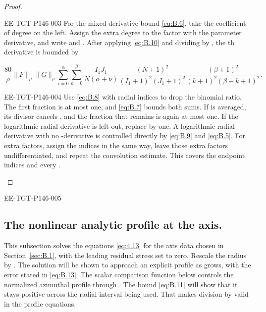 \begin{proof}
\begin{EESegment}{EE-TGT-P146-003}
For the mixed derivative bound \eqref{eq:B.6}, take the coefficient of degree
 on the left. Assign the extra degree to the factor with the parameter
derivative, and write  and .
After applying \eqref{eq:B.10} and dividing by , the
th derivative is bounded by
\end{EESegment}
\begin{equation*}
  \frac{80}{\rho}\lVert F\rVert_\rho\lVert G\rVert_\rho
  \sum_{i=0}^{\alpha}\sum_{k=0}^{\beta}
  \frac{I_1J_1}{N(\alpha+\nu)}
  \frac{(N+1)^2}{(I_1+1)^2(J_1+1)^2}
  \frac{(\beta+1)^2}{(k+1)^2(\beta-k+1)^2}.
\end{equation*}
\begin{EESegment}{EE-TGT-P146-004}
Use \eqref{eq:B.8} with radial indices  to drop the binomial ratio.
The first fraction is at most one, and \eqref{eq:B.7} bounds both sums. If
 is averaged, its divisor  cancels
, and the fraction that remains is again at most one. If the logarithmic
radial derivative is left out, replace  by one. A logarithmic radial
derivative with no -derivative is controlled directly by
\eqref{eq:B.9} and \eqref{eq:B.5}. For extra factors, assign the indices in the same way, leave
those extra factors undifferentiated, and repeat the convolution estimate. This covers the endpoint
indices and every .
\end{EESegment}
\end{proof}

\begin{EESegment}{EE-TGT-P146-005}
\subsection{The nonlinear analytic profile at the axis.}\label{sec:B.3}
This subsection solves the equations \eqref{eq:4.13} for the axis data chosen in
Section~\ref{sec:B.1}, with the leading residual stress set to zero. Rescale the radius by
. The solution will be shown to approach an explicit profile as
 grows, with the error stated in \eqref{eq:B.13}. The scalar comparison
function  below controls the normalized azimuthal profile
 through . The bound
\eqref{eq:B.11} will show that it stays positive across the radial interval being used. That makes
division by  valid in the profile equations.
\end{EESegment}

